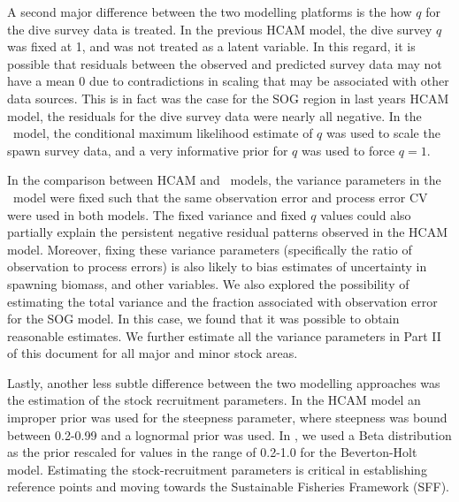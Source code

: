 A second major difference between the two modelling platforms is the how $q$ for the dive survey data is treated.  In the previous HCAM model, the dive survey $q$ was fixed at 1, and was not treated as a latent variable.  In this regard, it is possible that residuals between the observed and predicted survey data may not have a mean 0 due to contradictions in scaling that may be associated with other data sources. This is in fact was the case for the SOG region in last years HCAM model, the residuals for the dive survey data were nearly all negative.  In the \iscam\ model, the conditional maximum likelihood estimate of $q$ was used to scale the spawn survey data, and a very informative prior for $q$ was used to force $q=1$.

In the comparison between HCAM and  \iscam\ models, the variance parameters in the \iscam\ model were fixed such that the same observation error and process error CV were used in both models.  The fixed variance and fixed $q$ values could also partially explain the persistent negative residual patterns observed in the HCAM model.  Moreover, fixing these variance parameters  (specifically the ratio of observation to process errors) is also likely to bias estimates of uncertainty in spawning biomass, and other variables.  We also explored the possibility of estimating the total variance and the fraction associated with observation error for the SOG model.  In this case, we found that it was possible to obtain reasonable estimates.  We further estimate all the variance parameters in Part II of this document for all major and minor stock areas.

Lastly, another less subtle difference between the two modelling approaches was the estimation of the stock recruitment parameters.  In the HCAM model an improper prior was used for the steepness parameter, where steepness was bound between 0.2-0.99 and a lognormal prior was used.  In \iscam, we used a Beta distribution as the prior rescaled for values in the range of 0.2-1.0 for the Beverton-Holt model.   Estimating the stock-recruitment parameters is critical in establishing reference points and moving towards the Sustainable Fisheries Framework (SFF). 

